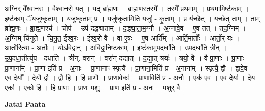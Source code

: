 \documentclass[17pt]{extarticle}
\begin{document}
अ॒ग्निर् वै᳚श्वान॒रः । वै॒श्वा॒न॒रो यत् । यद् ब्रा᳚ह्म॒णः । ब्रा॒ह्म॒णस्तस्मै᳚ । तस्मै᳚ प्रथ॒माम् । प्र॒थ॒मामिष्ट॑काम् । इष्ट॑का॒म् ॅयजु॑ष्कृताम् । यजु॑ष्कृता॒म् प्र । यजु॑ष्कृता॒मिति॒ यजुः॑ - कृ॒ता॒म् । प्र य॑च्छेत् । य॒च्छे॒त् ताम् । ताम् ब्रा᳚ह्म॒णः । ब्रा॒ह्म॒णश्च॑ । चोप॑ । उप॑ दद्ध्याताम् । द॒द्ध्या॒ता॒म॒ग्नौ । अ॒ग्नावे॒व । ए॒व तत् । तद॒ग्निम् । अ॒ग्निम् चि॑नुते । चि॒नु॒त॒ ई॒श्व॒रः । ई॒श्व॒रो वै । वा ए॒षः । ए॒ष आर्ति᳚म् । आर्ति॒मार्तोः᳚ । आर्तो॒र् यः । आर्तो॒रित्या - अ॒र्तोः॒ । योऽवि॑द्वान् । अवि॑द्वा॒निष्ट॑काम् । इष्ट॑कामुप॒दधा॑ति । उ॒प॒दधा॑ति॒ त्रीन् । उ॒प॒दधा॒तीत्यु॑प - दधा॑ति । त्रीन्. वरान्॑ । वरा᳚न् दद्यात् । द॒द्या॒त् त्रयः॑ । त्रयो॒ वै । वै प्रा॒णाः । प्रा॒णाः प्रा॒णाना᳚म् । प्रा॒णा इति॑ प्र - अ॒नाः । प्रा॒णानाꣳ॒॒ स्पृत्यै᳚ । प्रा॒णाना॒मिति॑ प्र - अ॒नाना᳚म् । स्पृत्यै॒ द्वौ । द्वावे॒व । ए॒व देयौ᳚ । देयौ॒ द्वौ । द्वौ हि । हि प्रा॒णौ । प्रा॒णावेकः॑ । प्रा॒णाविति॑ प्र - अ॒नौ । एक॑ ए॒व । ए॒व देयः॑ । देय॒ एकः॑ । एको॒ हि । हि प्रा॒णः । प्रा॒णः प॒शुः । प्रा॒ण इति॑ प्र - अ॒नः । प॒शुर् वै \newline

\textbf{Jatai Paata} \newline
\end{document}
